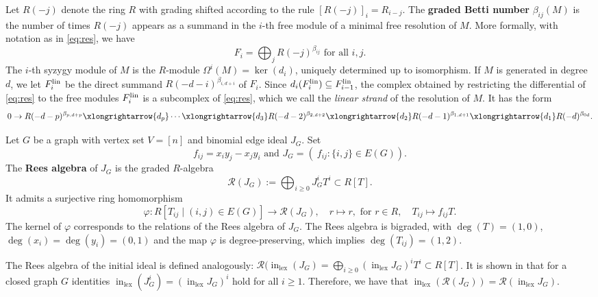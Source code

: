 \documentclass[reqno]{amsart}
\theoremstyle{definition}
\theoremstyle{remark}
\numberwithin{equation}{section}
\DeclareMathOperator{\init}{in}
\DeclareMathOperator{\lex}{lex}
\begin{document}
Let $R(-j)$ denote the ring $R$ with grading shifted according to the rule $[R(-j)]_i=R_{i-j}$.
The 
{\bf graded Betti number} $\beta_{ij}(M)$ is the number of times $R(-j)$ appears as a summand in the $i$-th free module of a minimal free resolution of $M$.  More formally, with notation  as in \eqref{eq:res}, we have
\[
F_i=\bigoplus_j R(-j)^{\beta_{ij}} \text{ for all }i,j.
\]
The $i$-th syzygy module of $M$ is the $R$-module $\Omega^i(M)=\ker(d_i)$, uniquely determined up to isomorphism. If $M$ is generated in degree $d$, we let $F_i^{\rm lin}$ be the direct summand $R(-d-i)^{\beta_{i,d+i}}$ of $F_i$. Since $d_i(F_i^{\rm lin})\subseteq F_{i-1}^{\rm lin}$,
the complex obtained by restricting the differential of \eqref{eq:res} to the free modules $F_i^{\rm lin}$ is a subcomplex of \eqref{eq:res}, which 
we call the {\em linear strand} of the resolution of $M$. It has the form
\[
0\rightarrow R(-d-p)^{\beta_{p,d+p}} \xlongrightarrow{d_p}
\cdots \xlongrightarrow{d_3}  R(-d-2)^{\beta_{2,d+2}} \xlongrightarrow{d_2}
R(-d-1)^{\beta_{1,d+1}}
\xlongrightarrow{d_1}
R(-d)^{\beta_{0d}}.
\]





Let $G$ be a  graph with vertex set $V=[n]$ and binomial edge ideal  $J_{G}$. Set 
    \begin{equation}\label{eq: JG}
    f_{ij}=x_iy_j-x_jy_i \text{ and }    J_G=(\ f_{ij} : \{i,j\}\in E(G)).
    \end{equation} 
The {\bf Rees algebra} of $J_G$ is the graded $R$-algebra
    \[\mathcal{R}(J_{G}):=\bigoplus_{i\geq 0} J_{G}^iT^i\subset R[T].\] 
      It admits a surjective ring homomorphism 
    \begin{equation}\label{eq: phi}
        \varphi: R[T_{ij} \mid (i,j)\in E(G)] \longrightarrow\mathcal{R}(J_G),\quad r\mapsto r, \text{ for }r\in R,\quad T_{ij}\mapsto f_{ij}T.
    \end{equation}
  The kernel of \(\varphi\) corresponds to  the relations of the Rees algebra of $J_G$. The Rees algebra is bigraded, with $\deg(T) = (1,0)$, $\deg(x_i) = \deg(y_i) = (0,1)$ and the map $\varphi$ is degree-preserving, which implies $\deg(T_{ij}) = (1,2)$.
    

The  Rees algebra of the initial ideal is defined analogously: $\mathcal{R}(\init_{\lex}( J_G)=\bigoplus_{i \geq 0} (\init_{\lex} J_G)^iT^i \subset R[T]$. It is shown in \cite[Equation (3)]{ene2016powers} that for a closed graph $G$  identities $\init_{\lex} (J_G^i) = (\init_{\lex} J_G)^i$ hold for all $i\geq 1$. Therefore, we have that
$\init_{\lex} (\mathcal R(J_G)) = \mathcal R(\init_{\lex}J_G)$.
\end{document}
